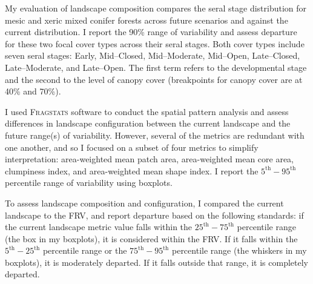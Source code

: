 My evaluation of landscape composition compares the seral stage distribution for mesic and xeric mixed conifer forests across future scenarios and against the current distribution. I report the 90\% range of variability and assess departure for these two focal cover types across their seral stages. Both cover types include seven seral stages: Early, Mid--Closed, Mid--Moderate, Mid--Open, Late--Closed, Late--Moderate, and Late--Open. The first term refers to the developmental stage and the second to the level of canopy cover (breakpoints for canopy cover are at 40\% and 70\%).


%
I used \textsc{Fragstats} software \citep{Fragstats2012} to conduct the spatial pattern analysis and assess differences in landscape configuration between the current landscape and the future range(s) of variability. However, several of the metrics are redundant with one another, and so I focused on a subset of four metrics to simplify interpretation: area-weighted mean patch area, area-weighted mean core area, clumpiness index, and area-weighted mean shape index. I report the $5^{\text{th}}-95^{\text{th}}$ percentile range of variability using boxplots. %

To assess landscape composition and configuration, I compared the current landscape to the FRV, and report departure based on the following standards: if the current landscape metric value falls within the $25^{\text{th}}-75^{\text{th}}$ percentile range (the box in my boxplots), it is considered within the FRV. If it falls within the $5^{\text{th}}-25^{\text{th}}$ percentile range or the $75^{\text{th}}-95^{\text{th}}$ percentile range (the whiskers in my boxplots), it is moderately departed. If it falls outside that range, it is completely departed.



